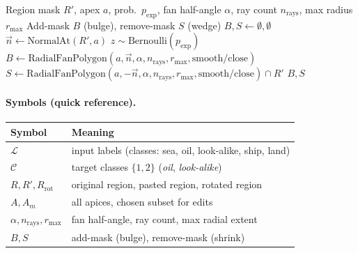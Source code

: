 \documentclass[12pt]{article}
\begin{document}
\begin{algorithm}[H]
\caption{ApexEdit (expand or shrink at a point)}
\label{alg:apexedit}
\begin{algorithmic}[1]
\Require Region mask $R'$, apex $a$, prob.\ $p_{\mathrm{exp}}$, fan half-angle $\alpha$, ray count $n_{\mathrm{rays}}$, max radius $r_{\max}$
\Ensure Add-mask $B$ (bulge), remove-mask $S$ (wedge)
\State $B,S \gets \emptyset,\emptyset$
\State $\vec{n} \gets \mathrm{NormalAt}(R',a)$ 
\State $z \sim \mathrm{Bernoulli}(p_{\mathrm{exp}})$
 
  \State $B \gets \mathrm{RadialFanPolygon}(a,\vec{n},\alpha,n_{\mathrm{rays}},r_{\max},\text{smooth/close})$
\Else {}
  \State $S \gets \mathrm{RadialFanPolygon}(a,-\vec{n},\alpha,n_{\mathrm{rays}},r_{\max},\text{smooth/close}) \cap R'$
\EndIf
\State \Return $B,S$
\end{algorithmic}
\end{algorithm}

\vspace{-0.25em}
\paragraph{Symbols (quick reference).}
\begin{center}
\begin{tabular}{@{}ll@{}}
\toprule
Symbol & Meaning \\
\midrule
$\mathcal{L}$ & input labels (classes: sea, oil, look-alike, ship, land) \\
$\mathcal{C}$ & target classes $\{1,2\}$ (\emph{oil}, \emph{look-alike}) \\
$R, R', R_{\mathrm{rot}}$ & original region, pasted region, rotated region \\
$A, A_m$ & all apices, chosen subset for edits \\
$\alpha, n_{\mathrm{rays}}, r_{\max}$ & fan half-angle, ray count, max radial extent \\
$B, S$ & add-mask (bulge), remove-mask (shrink) \\
\bottomrule
\end{tabular}
\end{center}
\end{document}
